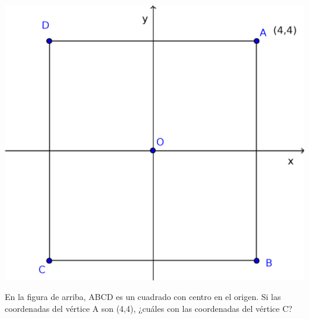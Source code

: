 \documentclass[letterpaper,10pt]{examdesign}
\begin{document}
\begin{multiplechoice}[keycolumns=4,examcolumns=2]
\begin{question}
\end{question}
\begin{block}
\includegraphics[scale=.65]{Images/cuadrado4-4.png}
\begin{question}
En la figura de arriba, ABCD es un cuadrado con centro en el origen. Si las coordenadas del vértice A son (4,4), ¿cuáles con las coordenadas del vértice C?
\end{question}
\end{block}
\end{multiplechoice}
\end{document}
